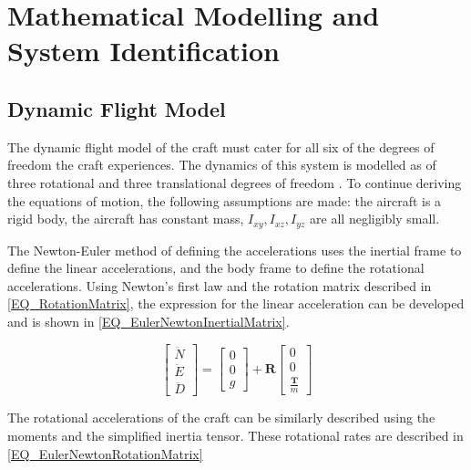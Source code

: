 \chapter{Mathematical Modelling and System Identification}
	
\section{Dynamic Flight Model}\label{SSECT_DynamicFLightModel}
The dynamic flight model of the craft must cater for all six of the degrees of freedom the craft experiences. The dynamics of this system is modelled as of three rotational and three translational degrees of freedom \cite{Moller2015}. To continue deriving the equations of motion, the following assumptions are made: the aircraft is a rigid body, the aircraft has constant mass, $I_{xy}, I_{xz}, I_{yz}$ are all negligibly small.   

The Newton-Euler method of defining the accelerations uses the inertial frame to define the linear accelerations, and the body frame to define the rotational accelerations. Using Newton's first law and the rotation matrix described in \eqref{EQ_RotationMatrix}, the expression for the linear acceleration can be developed and is shown in \eqref{EQ_EulerNewtonInertialMatrix}.

\begin{equation}
\begin{bmatrix} \ddot{N}\\ \ddot{E}\\ \ddot{D} \end{bmatrix} = \begin{bmatrix} 0\\ 0\\ g \end{bmatrix} + \textbf{R} \begin{bmatrix} 0\\ 0\\ \frac{\textbf{T}}{m} \end{bmatrix}
\label{EQ_EulerNewtonInertialMatrix}
\end{equation}

The rotational accelerations of the craft can be similarly described using the moments and the simplified inertia tensor. These rotational rates are described in \eqref{EQ_EulerNewtonRotationMatrix}

